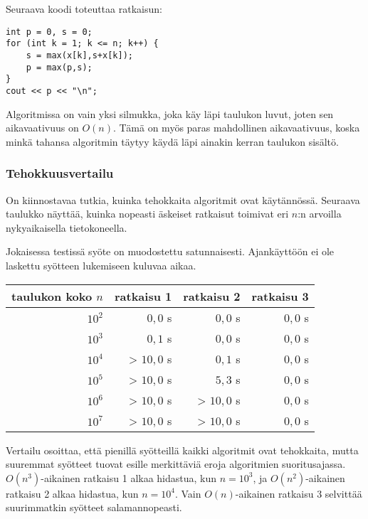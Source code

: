 Seuraava koodi toteuttaa ratkaisun:

\begin{lstlisting}
int p = 0, s = 0;
for (int k = 1; k <= n; k++) {
    s = max(x[k],s+x[k]);
    p = max(p,s);
}
cout << p << "\n";
\end{lstlisting}

Algoritmissa on vain yksi silmukka,
joka käy läpi taulukon luvut,
joten sen aikavaativuus on $O(n)$.
Tämä on myös paras mahdollinen aikavaativuus,
koska minkä tahansa algoritmin täytyy käydä
läpi ainakin kerran taulukon sisältö.

\subsubsection{Tehokkuusvertailu}

On kiinnostavaa tutkia, kuinka tehokkaita algoritmit
ovat käytännössä.
Seuraava taulukko näyttää, kuinka nopeasti äskeiset
ratkaisut toimivat eri $n$:n arvoilla
nykyaikaisella tietokoneella.

Jokaisessa testissä syöte on muodostettu satunnaisesti.
Ajankäyttöön ei ole laskettu syötteen lukemiseen
kuluvaa aikaa.

\begin{center}
\begin{tabular}{rrrr}
taulukon koko $n$ & ratkaisu 1 & ratkaisu 2 & ratkaisu 3 \\
\hline
$10^2$ & $0{,}0$ s & $0{,}0$ s & $0{,}0$ s \\
$10^3$ & $0{,}1$ s & $0{,}0$ s & $0{,}0$ s \\
$10^4$ & > $10,0$ s & $0{,}1$ s & $0{,}0$ s \\
$10^5$ & > $10,0$ s & $5{,}3$ s & $0{,}0$ s \\
$10^6$ & > $10,0$ s & > $10,0$ s & $0{,}0$ s \\
$10^7$ & > $10,0$ s & > $10,0$ s & $0{,}0$ s \\
\end{tabular}
\end{center}

Vertailu osoittaa,
että pienillä syötteillä kaikki algoritmit
ovat tehokkaita,
mutta suuremmat syötteet tuovat esille
merkittäviä eroja algoritmien suoritusajassa.
$O(n^3)$-aikainen ratkaisu 1 alkaa hidastua,
kun $n=10^3$, ja $O(n^2)$-aikainen ratkaisu 2
alkaa hidastua, kun $n=10^4$.
Vain $O(n)$-aikainen ratkaisu 3 selvittää
suurimmatkin syötteet salamannopeasti.
